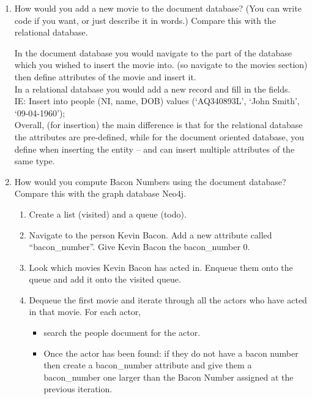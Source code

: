 \documentclass[10pt,\jkfside,a4paper]{article}
\begin{document}
\begin{enumerate}

\item{How would you add a new movie to the document database? (You can 
write code if you want, or just describe it in words.) Compare this with 
the relational database.}

In the document database you would navigate to the part of the database which you 
wished to insert the movie into. (so navigate to the movies section) then define 
attributes of the movie and insert it.\\
In a relational database you would add a new record and fill in the fields.\\
IE: Insert into people (NI, name, DOB) values (`AQ340893L', `John Smith', `09-04-1960');\\
Overall, (for insertion) the main difference is that for the relational database 
the attributes are pre-defined, while for the document oriented database, you define 
when inserting the entity -- and can insert multiple attributes of the same type.

\item{How would you compute Bacon Numbers using the document database? 
Compare this with the graph database Neo4j.}

\begin{enumerate}

\item Create a list (visited) and a queue (todo).

\item Navigate to the person Kevin Bacon. Add a new attribute called ``bacon\_number''. 
Give Kevin Bacon the bacon\_number 0.

\item Look which movies Kevin Bacon has acted in. Enqueue them onto the queue and add it 
onto the visited queue.

\item \label{itm:repeat} Dequeue the first movie and iterate through all the 
actors who have acted in that movie. For each actor, 

\begin{itemize} 

\item search the people document for the actor. 

\item Once the actor has been found: if they do not have a bacon number then create a 
bacon\_number attribute and give them a bacon\_number one larger than the Bacon Number 
assigned at the previous iteration. 


\end{itemize}
\end{enumerate}
\end{enumerate}
\end{document}
